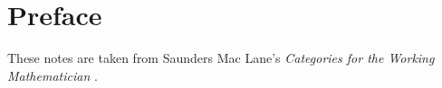 \section*{Preface}

These notes are taken from Saunders Mac Lane's \textit{Categories for the Working Mathematician} \cite{cfwm}.
